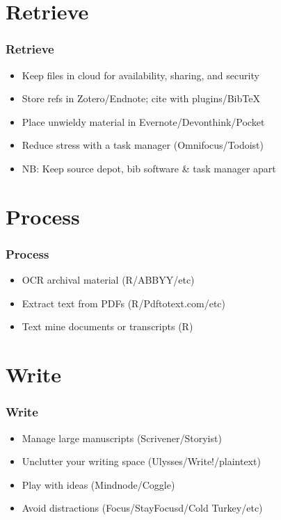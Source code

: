 \documentclass{beamer}
\begin{document}
\section{Retrieve}

\begin{frame}
\frametitle{Retrieve}
    \begin{itemize}
        \item Keep files in cloud for availability, sharing, and security
        \item Store refs in Zotero/Endnote; cite with plugins/BibTeX
        \item Place unwieldy material in Evernote/Devonthink/Pocket
        \item Reduce stress with a task manager (Omnifocus/Todoist)
        \item NB: Keep source depot, bib software \& task manager apart
    \end{itemize}
\end{frame}

\section{Process}

\begin{frame}
\frametitle{Process}
    \begin{itemize}
        \item OCR archival material (R/ABBYY/etc)
        \item Extract text from PDFs (R/Pdftotext.com/etc) 
        \item Text mine documents or transcripts (R)
    \end{itemize}
\end{frame}

\section{Write}

\begin{frame}
\frametitle{Write}
    \begin{itemize}
        \item Manage large manuscripts (Scrivener/Storyist)
        \item Unclutter your writing space (Ulysses/Write!/plaintext)
        \item Play with ideas (Mindnode/Coggle)
        \item Avoid distractions (Focus/StayFocusd/Cold Turkey/etc)
    \end{itemize}
\end{frame}
\end{document}
